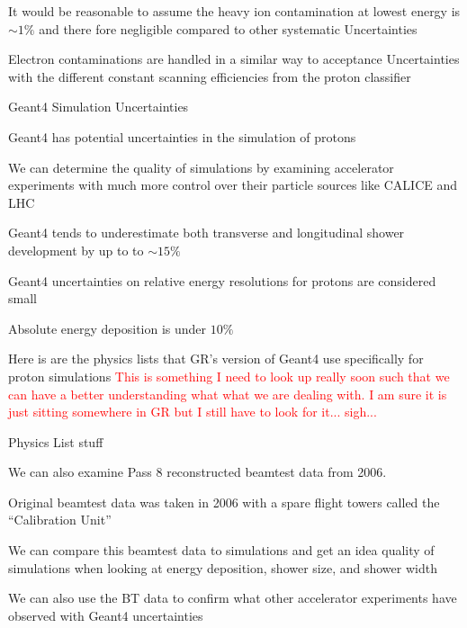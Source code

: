 \documentclass{article}
\begin{document}
\begin{myEnumerate}
\begin{myEnumerate}
\begin{myEnumerate}
				\item It would be reasonable to assume the heavy ion contamination at lowest energy is $\sim 1\%$ and there fore negligible compared to other systematic Uncertainties
				\item Electron contaminations are handled in a similar way to acceptance Uncertainties with the different constant scanning efficiencies from the proton classifier
			\end{myEnumerate}
			\item Geant4 Simulation Uncertainties
			\begin{myEnumerate}
				\item Geant4 has potential uncertainties in the simulation of protons
				\item We can determine the quality of simulations by examining accelerator experiments with much more control over their particle sources like CALICE and LHC
				\begin{myEnumerate}
					\item Geant4 tends to underestimate both transverse and longitudinal shower development by up to to $\sim 15\%$
					\item Geant4 uncertainties on relative energy resolutions for protons are considered small
					\item Absolute energy deposition is under $10\%$
				\end{myEnumerate}
				\item Here is are the physics lists that GR's version of Geant4 use specifically for proton simulations \textcolor{red}{This is something I need to look up really soon such that we can have a better understanding what what we are dealing with.  I am sure it is just sitting somewhere in GR but I still have to look for it... sigh...}
				\begin{myEnumerate}
					\item  Physics List stuff
				\end{myEnumerate}
				\item We can also examine Pass 8 reconstructed beamtest data from 2006.  
				\begin{myEnumerate}
					\item Original beamtest data was taken in 2006 with a spare flight towers called the ``Calibration Unit''
					\item We can compare this beamtest data to simulations and get an idea quality of simulations when looking at energy deposition, shower size, and shower width
					\item We can also use the BT data to confirm what other accelerator experiments have observed with Geant4 uncertainties

\end{myEnumerate}
\end{myEnumerate}
\end{myEnumerate}
\end{myEnumerate}
\end{document}
